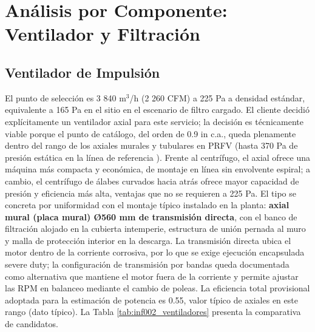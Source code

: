 \section{Análisis por Componente: Ventilador y Filtración}

\subsection{Ventilador de Impulsión}

El punto de selección es 3 840 m$^3$/h (2 260 CFM) a 225 Pa a densidad estándar, equivalente a 165 Pa en el sitio en el escenario de filtro cargado. El cliente decidió explícitamente un ventilador axial para este servicio; la decisión es técnicamente viable porque el punto de catálogo, del orden de 0.9 in c.a., queda plenamente dentro del rango de los axiales murales y tubulares en PRFV (hasta 370 Pa de presión estática en la línea de referencia \cite{aerovent_fbd}). Frente al centrífugo, el axial ofrece una máquina más compacta y económica, de montaje en línea sin envolvente espiral; a cambio, el centrífugo de álabes curvados hacia atrás ofrece mayor capacidad de presión y eficiencia más alta, ventajas que no se requieren a 225 Pa. El tipo se concreta por uniformidad con el montaje típico instalado en la planta: \textbf{axial mural (placa mural) Ø560 mm de transmisión directa}, con el banco de filtración alojado en la cubierta intemperie, estructura de unión pernada al muro y malla de protección interior en la descarga. La transmisión directa ubica el motor dentro de la corriente corrosiva, por lo que se exige ejecución encapsulada severe duty; la configuración de transmisión por bandas queda documentada como alternativa que mantiene el motor fuera de la corriente y permite ajustar las RPM en balanceo mediante el cambio de poleas. La eficiencia total provisional adoptada para la estimación de potencia es 0.55, valor típico de axiales en este rango (dato típico). La Tabla \ref{tab:inf002_ventiladores} presenta la comparativa de candidatos.

